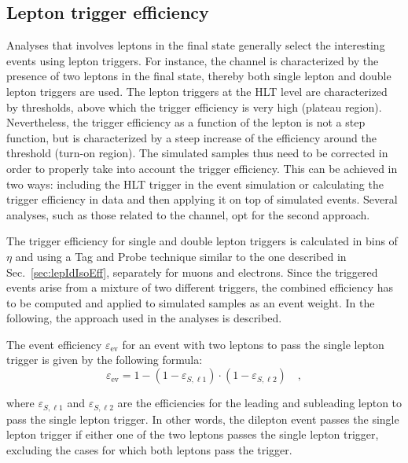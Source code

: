 \subsection{Lepton trigger efficiency}\label{sec:trigeff}
Analyses that involves leptons in the final state generally select the interesting events using lepton triggers. For instance, the \hwwllnn channel is characterized by the presence of two leptons in the final state, thereby both single lepton and double lepton triggers are used. The lepton triggers at the HLT level are characterized by \pt thresholds, above which the trigger efficiency is very high (plateau region). Nevertheless, the trigger efficiency as a function of the lepton \pt is not a step function, but is characterized by a steep increase of the efficiency around the \pt threshold (turn-on region). The simulated samples thus need to be corrected in order to properly take into account the trigger efficiency. This can be achieved in two ways: including the HLT trigger in the event simulation or calculating the trigger efficiency in data and then applying it on top of simulated events. Several analyses, such as those related to the \hwwllnn channel, opt for the second approach.

The trigger efficiency for single and double lepton triggers is calculated in bins of $\eta$ and \pt using a Tag and Probe technique similar to the one described in Sec.~\ref{sec:lepIdIsoEff}, separately for muons and electrons. Since the triggered events arise from a mixture of two different triggers, the combined efficiency has to be computed and applied to simulated samples as an event weight. In the following, the approach used in the \hwwllnn analyses is described.

The event efficiency $\varepsilon_\mathrm{ev}$ for an event with two leptons to pass the single lepton trigger is given by the following formula:
\begin{equation}\label{eq:single_trigg}
\varepsilon_\mathrm{ev} = 1 - (1-\varepsilon_{S,\ell1})\cdot(1-\varepsilon_{S,\ell2})\quad,
\end{equation}

\noindent where $\varepsilon_{S,\ell1}$ and $\varepsilon_{S,\ell2}$ are the efficiencies for the leading and subleading lepton to pass the single lepton trigger. In other words, the dilepton event passes the single lepton trigger if either one of the two leptons passes the single lepton trigger, excluding the cases for which both leptons pass the trigger. 

